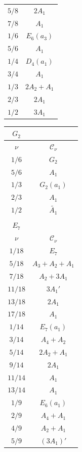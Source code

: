 \documentclass[11pt]{amsart}
\theoremstyle{definition}
\newcommand{\cC}{\mathcal{C}}
\begin{document}
\begin{table}[H]
\begin{tabular}{|c|c|}
\color{blue}$5/8$ & $2A_1$ \\
\color{blue}$7/8$ & $A_1$ \\
$1/6$ & $E_6(a_3)$ \\
$5/6$ & $A_1$ \\
\color{blue}$1/4$ & $D_4(a_1)$  \\
\color{blue}$3/4$ & $A_1$ \\
$1/3$ & $2A_2+A_1$ \\
$2/3$ & $2A_1$     \\
\color{blue}$1/2$ & $3A_1$ \\
\hline
\end{tabular}
\quad\quad 
\begin{tabular}{|c|c|}
\multicolumn{1}{c}{$G_2$} & \multicolumn{1}{c}{} \\ 
\hline
$\nu$ & $\cC_\nu$ \\
\hline
$1/6$ & $G_2$ \\
$5/6$ & $A_1$ \\
$1/3$ & $G_2(a_1)$ \\
$2/3$ & $A_1$ \\
$1/2$ & $\widetilde{A_1}$ \\
\hline 
\multicolumn{1}{c}{} & \multicolumn{1}{c}{} \\ 
\multicolumn{1}{c}{$E_7$} & \multicolumn{1}{c}{} \\ 
\hline
$\nu$ & $\cC_\nu$ \\
\hline
$1/18$  & $E_7$        \\
$5/18$  & $A_3+A_2+A_1$ \\
$7/18$  & $A_2+3A_1$    \\
$11/18$ & $3A_1'$       \\
$13/18$ & $2A_1$        \\
$17/18$ & $A_1$         \\
$1/14$  & $E_7(a_1)$    \\
$3/14$  & $A_4+A_2$     \\
$5/14$  & $2A_2+A_1$    \\
$9/14$  & $2A_1$        \\
$11/14$ & $A_1$         \\
$13/14$ & $A_1$         \\
\color{blue}$1/9$ & $E_6(a_1)$ \\
\color{blue}$2/9$ & $A_4+A_1$ \\
\color{blue}$4/9$ & $A_2+A_1$ \\
\color{blue}$5/9$ & $(3A_1)'$ \\

\end{tabular}
\end{table}
\end{document}
